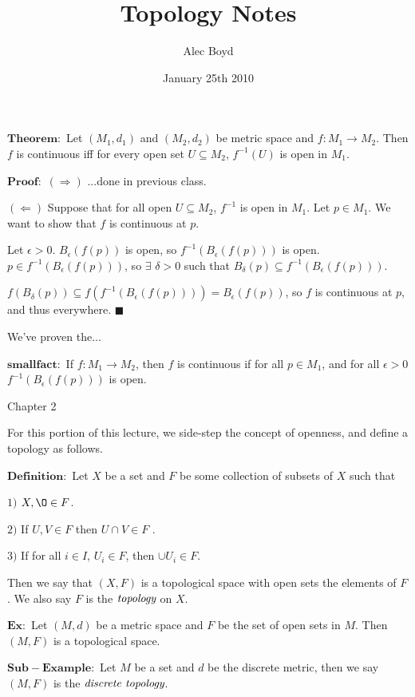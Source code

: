 \documentclass{article}
\title{Topology Notes}
\author{Alec Boyd}
\date{January 25th 2010}
\begin{document}
\maketitle

$\mathbf{Theorem:}$ Let $(M_{1},d_{1})$ and $(M_{2},d_{2})$ be metric space and $f:M_{1}\rightarrow M_{2}$.  Then $f$ is continuous iff for every open set $U\subseteq M_{2}$, $f^{-1}(U)$ is open in $M_{1}$.

$\mathbf{Proof:}$  $(\Rightarrow )$ ...done in previous class.

$(\Leftarrow)$ Suppose that for all open $U\subseteq M_{2}$, $f^{-1}$ is open in $M_{1}$.  Let $p \in M_{1}$.  We want to show that $f$ is continuous at $p$.

Let $\epsilon > 0$.  $B_{\epsilon}(f(p))$ is open, so $f^{-1}(B_{\epsilon}(f(p)))$ is open.  $p\in f^{-1}(B_{\epsilon}(f(p)))$, so $\exists$ $\delta>0$ such that $B_{\delta}(p)\subseteq f^{-1}(B_{\epsilon}(f(p)))$.

 $f(B_{\delta}(p))\subseteq f(f^{-1}(B_{\epsilon}(f(p))))=B_{\epsilon}(f(p))$, so $f$ is continuous at $p$, and thus everywhere.  $\blacksquare$
 
 We've proven the...
 
 $\mathbf{small fact:}$  If $f : M_{1} \rightarrow M_{2}$, then $f$ is continuous if for all $p\in M_{1}$, and for all $\epsilon>0$ $f^{-1}(B_{\epsilon}(f(p)))$ is open.
 
 
 \large{Chapter 2} \normalsize
 
 For this portion of this lecture, we side-step the concept of openness, and define a topology as follows.
 
 $\mathbf{Definition:}$  Let $X$ be a set and $F$ be some collection of subsets of $X$ such that
 	
		$1)$ $X,\O \in F$.
		
		$2)$ If $U,V \in F$ then $U\cap V \in F$ .
		
		$3)$ If for all $i\in I$, $U_{i} \in F$, then $\cup U_{i} \in F$.
		
	Then we say that $(X,F)$ is a topological space with open sets the elements of $F$.  We also 		say $F$ is the  $\emph{topology}$ on $X$.
	

$\mathbf{Ex:}$  Let $(M,d)$ be a metric space and $F$ be the set of open sets in $M$.  Then $(M,F)$ is a topological space.

$\mathbf{Sub-Example:}$  Let $M$ be a set and $d$ be the discrete metric, then we say $(M,F)$ is the $\emph{discrete topology}$.
\end{document}
